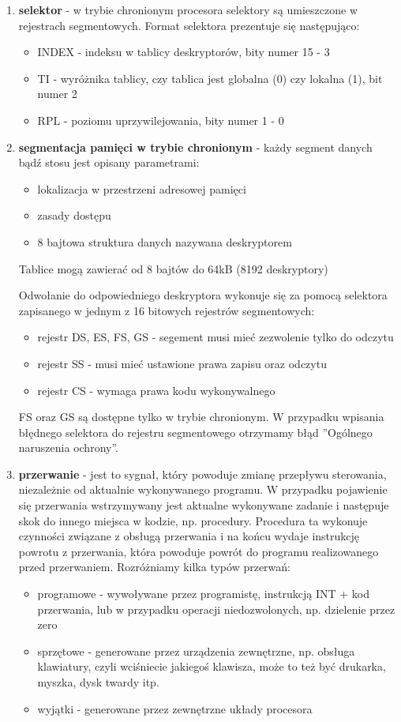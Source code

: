 \documentclass[a4paper,12pt]{article}
\begin{document}
\begin{enumerate}
				\item{\textbf{selektor} - w trybie chronionym procesora selektory są umieszczone w rejestrach segmentowych. Format selektora prezentuje się następująco:}

\begin{itemize}
\item{INDEX - indeksu w tablicy deskryptorów, bity numer 15 - 3}
\item{TI - wyróżnika tablicy, czy tablica jest globalna (0) czy lokalna (1), bit numer 2}
\item{RPL - poziomu uprzywilejowania, bity numer 1 - 0}
\end{itemize}


\item{\textbf{segmentacja pamięci w trybie chronionym} - każdy segment danych bądź stosu jest opisany parametrami:
\begin{itemize}
\item{lokalizacja w przestrzeni adresowej pamięci}
\item{zasady dostępu}
\item{8 bajtowa struktura danych nazywana deskryptorem}
\end{itemize}
Tablice mogą zawierać od 8 bajtów do 64kB (8192 deskryptory)

Odwołanie do odpowiedniego deskryptora wykonuje się za pomocą selektora zapisanego w jednym z 16 bitowych rejestrów segmentowych: 

\begin{itemize}
\item{rejestr DS, ES, FS, GS - segement musi mieć zezwolenie tylko do odczytu}
\item{rejestr SS - musi mieć ustawione prawa zapisu oraz odczytu}
\item{rejestr CS - wymaga prawa kodu wykonywalnego}
\end{itemize}
FS oraz GS są dostępne tylko w trybie chronionym. W przypadku wpisania błędnego selektora do rejestru segmentowego otrzymamy błąd ''Ogólnego naruszenia ochrony''. }
	
	\item{\textbf{przerwanie} - jest to sygnał, który powoduje zmianę przepływu sterowania, niezależnie od aktualnie wykonywanego programu. W przypadku pojawienie się przerwania wstrzymywany jest aktualne wykonywane zadanie i następuje skok do innego miejsca w kodzie, np. procedury. Procedura ta wykonuje czynności związane z obsługą przerwania i na końcu wydaje instrukcję powrotu z przerwania, która powoduje powrót do programu realizowanego przed przerwaniem.
Rozróżniamy kilka typów przerwań:}
\begin{itemize}
\item{programowe - wywoływane przez programistę, instrukcją INT + kod przerwania, lub w przypadku operacji niedozwolonych, np. dzielenie przez zero}
\item{sprzętowe - generowane przez urządzenia zewnętrzne, np. obsługa klawiatury, czyli wciśniecie jakiegoś klawisza, może to też być drukarka, myszka, dysk twardy itp.}
\item{wyjątki - generowane przez zewnętrzne układy procesora}
\end{itemize}


\end{enumerate}
\end{document}
